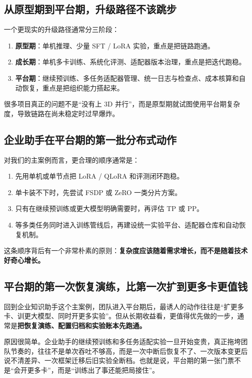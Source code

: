 \subsection{从原型期到平台期，升级路径不该跳步}
一个更现实的升级路径通常分三阶段：
\begin{enumerate}
  \item \textbf{原型期}：单机推理、少量 SFT / LoRA 实验，重点是把链路跑通。
  \item \textbf{成长期}：单机多卡训练、系统化评测、适配器版本治理，重点是把迭代跑稳。
  \item \textbf{平台期}：继续预训练、多任务适配器管理、统一日志与检查点、成本核算和自动恢复，重点是把组织能力搭起来。
\end{enumerate}

很多项目真正的问题不是“没有上 3D 并行”，而是原型期就试图使用平台期复杂度，导致链路在尚未稳定时过早爆炸。

\subsection{企业助手在平台期的第一批分布式动作}
对我们的主案例而言，更合理的顺序通常是：
\begin{enumerate}
  \item 先用单机或单节点把 LoRA / QLoRA 和评测闭环跑稳。
  \item 单卡装不下时，先尝试 FSDP 或 ZeRO 一类分片方案。
  \item 只有在继续预训练或更大模型明确需要时，再评估 TP 或 PP。
  \item 等多类任务同时进入训练管线后，再建设统一实验平台、适配器仓库和自动恢复机制。
\end{enumerate}

这条顺序背后有一个非常朴素的原则：\textbf{复杂度应该随着需求增长，而不是随着技术好奇心增长。}

\subsection{平台期的第一次恢复演练，比第一次扩到更多卡更值钱}
回到企业知识助手这个主案例，团队进入平台期后，最诱人的动作往往是“扩更多卡、训更大模型、同时开更多实验”。但从长期收益看，更值得优先做的一步，通常是\textbf{把恢复演练、配置归档和实验账本先跑通。}

原因很简单。企业助手的继续预训练和多任务适配实验一旦开始变贵，真正拖垮团队节奏的，往往不是单次吞吐不够高，而是一次中断后恢复不了、一次版本变更后说不清差异、一次框架迁移后旧实验全断档。也就是说，平台期的第一张门票不是“会开更多卡”，而是“训练出了事还能把局接住”。

